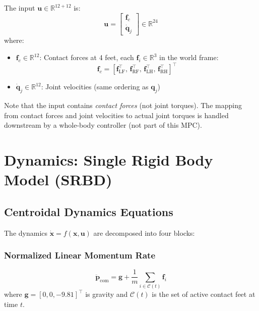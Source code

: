 \documentclass[11pt,a4paper]{article}
\newcommand{\R}{\mathbb{R}}==
\begin{document}
The input $\bm{u} \in \R^{12+12}$ is:
\begin{equation}
	\bm{u} = \begin{bmatrix} \bm{f}_c \\ \dot{\bm{q}}_j \end{bmatrix}
	\in \R^{24}
\end{equation}
where:
\begin{itemize}
	\item $\bm{f}_c \in \R^{12}$: Contact forces at 4 feet, each $\bm{f}_i \in \R^3$ in the world frame:
	      \begin{equation*}
		      \bm{f}_c = [\bm{f}_{\text{LF}}^\top,\, \bm{f}_{\text{RF}}^\top,\, \bm{f}_{\text{LH}}^\top,\, \bm{f}_{\text{RH}}^\top]^\top
	      \end{equation*}
	\item $\dot{\bm{q}}_j \in \R^{12}$: Joint velocities (same ordering as $\bm{q}_j$)
\end{itemize}

\noindent Note that the input contains \emph{contact forces} (not joint torques). The mapping from contact forces and joint velocities to actual joint torques is handled downstream by a whole-body controller (not part of this MPC).


\section{Dynamics: Single Rigid Body Model (SRBD)}
\label{sec:dynamics}

\subsection{Centroidal Dynamics Equations}

The dynamics $\dot{\bm{x}} = f(\bm{x}, \bm{u})$ are decomposed into four blocks:

\subsubsection{Normalized Linear Momentum Rate}

\begin{equation}
	\boxed{
		\ddot{\bm{p}}_{\text{com}} = \bm{g} + \frac{1}{m}\sum_{i \in \mathcal{C}(t)} \bm{f}_i
	}
\end{equation}
where $\bm{g} = [0, 0, -9.81]^\top$ is gravity and $\mathcal{C}(t)$ is the set of active contact feet at time $t$.
\end{document}

